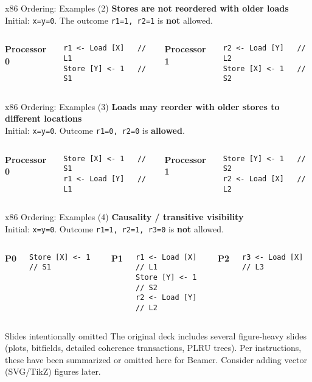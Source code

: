 \documentclass[aspectratio=169,12pt]{beamer}
\begin{document}
\begin{frame}[fragile]{x86 Ordering: Examples (2)}
\textbf{Stores are not reordered with older loads}\\[3pt]
Initial: \texttt{x=y=0}. The outcome \texttt{r1=1, r2=1} is \textbf{not} allowed.
\begin{columns}[T]
\textbf{Processor 0}
\begin{lstlisting}[basicstyle=\ttfamily\small]
r1 <- Load [X]   // L1
Store [Y] <- 1   // S1
\end{lstlisting}
\textbf{Processor 1}
\begin{lstlisting}[basicstyle=\ttfamily\small]
r2 <- Load [Y]   // L2
Store [X] <- 1   // S2
\end{lstlisting}
\end{columns}
\end{frame}

\begin{frame}[fragile]{x86 Ordering: Examples (3)}
\textbf{Loads may reorder with older stores to different locations}\\[3pt]
Initial: \texttt{x=y=0}. Outcome \texttt{r1=0, r2=0} is \textbf{allowed}.
\begin{columns}[T]
\textbf{Processor 0}
\begin{lstlisting}[basicstyle=\ttfamily\small]
Store [X] <- 1   // S1
r1 <- Load [Y]   // L1
\end{lstlisting}
\textbf{Processor 1}
\begin{lstlisting}[basicstyle=\ttfamily\small]
Store [Y] <- 1   // S2
r2 <- Load [X]   // L2
\end{lstlisting}
\end{columns}
\end{frame}

\begin{frame}[fragile]{x86 Ordering: Examples (4)}
\textbf{Causality / transitive visibility}\\[3pt]
Initial: \texttt{x=y=0}. Outcome \texttt{r1=1, r2=1, r3=0} is \textbf{not} allowed.
\begin{columns}[T]
\textbf{P0}
\begin{lstlisting}[basicstyle=\ttfamily\small]
Store [X] <- 1   // S1
\end{lstlisting}
\textbf{P1}
\begin{lstlisting}[basicstyle=\ttfamily\small]
r1 <- Load [X]   // L1
Store [Y] <- 1   // S2
r2 <- Load [Y]   // L2
\end{lstlisting}
\textbf{P2}
\begin{lstlisting}[basicstyle=\ttfamily\small]
r3 <- Load [X]   // L3
\end{lstlisting}
\end{columns}
\end{frame}

\begin{frame}{Slides intentionally omitted}
The original deck includes several figure-heavy slides (plots, bitfields, detailed
coherence transactions, PLRU trees). Per instructions, these have been summarized
or omitted here for Beamer. Consider adding vector (SVG/TikZ) figures later.
\end{frame}
\end{document}
